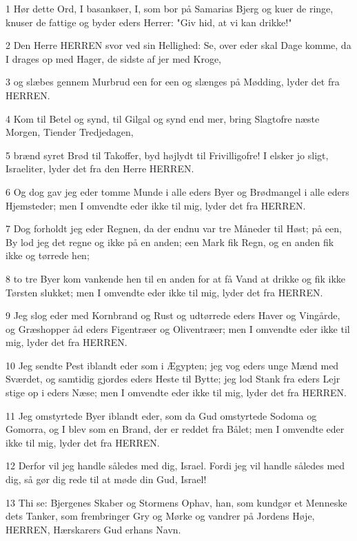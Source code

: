 \par 1 Hør dette Ord, I basankøer, I, som bor på Samarias Bjerg og kuer de ringe, knuser de fattige og byder eders Herrer: "Giv hid, at vi kan drikke!"
\par 2 Den Herre HERREN svor ved sin Hellighed: Se, over eder skal Dage komme, da I drages op med Hager, de sidste af jer med Kroge,
\par 3 og slæbes gennem Murbrud een for een og slænges på Mødding, lyder det fra HERREN.
\par 4 Kom til Betel og synd, til Gilgal og synd end mer, bring Slagtofre næste Morgen, Tiender Tredjedagen,
\par 5 brænd syret Brød til Takoffer, byd højlydt til Frivilligofre! I elsker jo sligt, Israeliter, lyder det fra den Herre HERREN.
\par 6 Og dog gav jeg eder tomme Munde i alle eders Byer og Brødmangel i alle eders Hjemsteder; men I omvendte eder ikke til mig, lyder det fra HERREN.
\par 7 Dog forholdt jeg eder Regnen, da der endnu var tre Måneder til Høst; på een, By lod jeg det regne og ikke på en anden; een Mark fik Regn, og en anden fik ikke og tørrede hen;
\par 8 to tre Byer kom vankende hen til en anden for at få Vand at drikke og fik ikke Tørsten slukket; men I omvendte eder ikke til mig, lyder det fra HERREN.
\par 9 Jeg slog eder med Kornbrand og Rust og udtørrede eders Haver og Vingårde, og Græshopper åd eders Figentræer og Oliventræer; men I omvendte eder ikke til mig, lyder det fra HERREN.
\par 10 Jeg sendte Pest iblandt eder som i Ægypten; jeg vog eders unge Mænd med Sværdet, og samtidig gjordes eders Heste til Bytte; jeg lod Stank fra eders Lejr stige op i eders Næse; men I omvendte eder ikke til mig, lyder det fra HERREN.
\par 11 Jeg omstyrtede Byer iblandt eder, som da Gud omstyrtede Sodoma og Gomorra, og I blev som en Brand, der er reddet fra Bålet; men I omvendte eder ikke til mig, lyder det fra HERREN.
\par 12 Derfor vil jeg handle således med dig, Israel. Fordi jeg vil handle således med dig, så gør dig rede til at møde din Gud, Israel!
\par 13 Thi se: Bjergenes Skaber og Stormens Ophav, han, som kundgør et Menneske dets Tanker, som frembringer Gry og Mørke og vandrer på Jordens Høje, HERREN, Hærskarers Gud erhans Navn.

